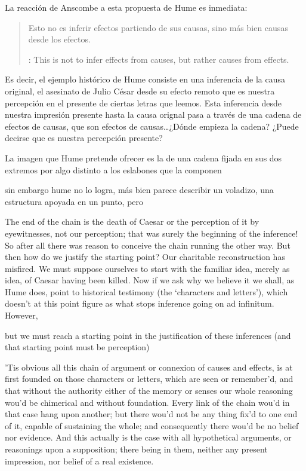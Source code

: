 La reacción de Anscombe a esta propuesta de Hume es inmediata:
\blockquote[{\cite[86]{anscombe1981hjc}}: This is not to infer effects from
causes, but rather causes from effects.]{Esto no es inferir efectos partiendo de
  sus causas, sino más bien causas desde los efectos.} Es decir, el ejemplo
histórico de Hume consiste en una inferencia de la causa original, el asesinato
de Julio César desde su efecto remoto que es nuestra percepción en el presente
de ciertas letras que leemos. Esta inferencia desde nuestra impresión presente
hasta la causa orignal pasa a través de una cadena de efectos de causas, que son
efectos de causas\ldots ¿Dónde empieza la cadena? ¿Puede decirse que es nuestra
percepción presente?

La imagen que Hume pretende ofrecer es la de una cadena fijada en sus dos
extremos por algo distinto a los eslabones que la componen

sin embargo hume no lo logra, más bien parece describir un voladizo, una
estructura apoyada en un punto, pero


The end of the chain is the death of Caesar or the perception of it by
eyewitnesses, not our perception; that was surely the beginning of the
inference! So after all there was reason to conceive the chain running the other
way. But then how do we justify the starting point? Our charitable
reconstruction has misfired. We must suppose ourselves to start with the
familiar idea, merely as idea, of Caesar having been killed. Now if we ask why
we believe it we shall, as Hume does, point to historical testimony (the
‘characters and letters’), which doesn’t at this point figure as what stops
inference going on ad infinitum. However,


but we must reach a starting point in the justification of these inferences (and
that starting point must be perception)

’Tis obvious all this chain of argument or connexion of causes and effects, is
at first founded on those characters or letters, which are seen or remember’d,
and that without the authority either of the memory or senses our whole
reasoning wou’d be chimerical and without foundation. Every link of the chain
wou’d in that case hang upon another; but there wou’d not be any thing fix’d to
one end of it, capable of sustaining the whole; and consequently there wou’d be
no belief nor evidence. And this actually is the case with all hypothetical
arguments, or reasonings upon a supposition; there being in them, neither any
present impression, nor belief of a real existence.


